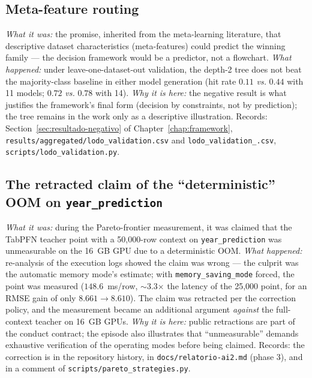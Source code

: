 \subsection{Meta-feature routing}
\emph{What it was:} the promise, inherited from the meta-learning
literature, that descriptive dataset characteristics (meta-features)
could predict the winning family --- the decision framework would be
a predictor, not a flowchart. \emph{What happened:} under
leave-one-dataset-out validation, the depth-2 tree does not beat the
majority-class baseline in either model generation (hit rate $0.11$
\emph{vs.} $0.44$ with 11 models; $0.72$ \emph{vs.} $0.78$ with 14).
\emph{Why it is here:} the negative result is what justifies the
framework's final form (decision by constraints, not by prediction);
the tree remains in the work only as a descriptive illustration.
Records: Section~\ref{sec:resultado-negativo} of
Chapter~\ref{chap:framework},
\texttt{results/\allowbreak aggregated/\allowbreak lodo\_\allowbreak validation.\allowbreak csv}
and \texttt{lodo\_\allowbreak validation\_.\allowbreak csv},
\texttt{scripts/\allowbreak lodo\_\allowbreak validation.\allowbreak py}.

\subsection[Retracted OOM claim on year\_prediction]{The retracted claim of the ``deterministic'' OOM on
\texttt{year\_\allowbreak prediction}}
\emph{What it was:} during the Pareto-frontier measurement, it was
claimed that the TabPFN teacher point with a 50{,}000-row context on
\texttt{year\_\allowbreak prediction} was unmeasurable on the 16~GB
GPU due to a deterministic OOM. \emph{What happened:} re-analysis of
the execution logs showed the claim was wrong --- the culprit was
the automatic memory mode's estimate; with
\texttt{memory\_\allowbreak saving\_\allowbreak mode} forced, the
point was measured ($148.6$~ms/row, $\sim$3.3$\times$ the latency of
the 25{,}000 point, for an RMSE gain of only $8.661 \to 8.610$). The
claim was retracted per the correction policy, and the measurement
became an additional argument \emph{against} the full-context
teacher on 16~GB GPUs. \emph{Why it is here:} public retractions are
part of the conduct contract; the episode also illustrates that
``unmeasurable'' demands exhaustive verification of the operating
modes before being claimed. Records: the correction is in the
repository history, in
\texttt{docs/\allowbreak relatorio-\allowbreak ai2.\allowbreak md}
(phase 3), and in a comment of
\texttt{scripts/\allowbreak pareto\_\allowbreak strategies.\allowbreak py}.

